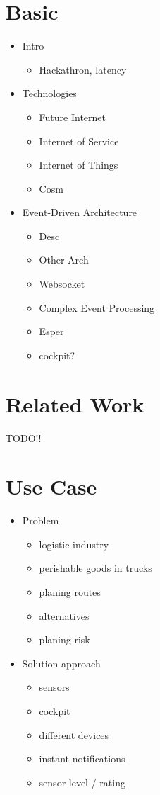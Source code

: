 \documentclass{acm_proc_article-sp}
\begin{document}
\section{Basic}
\label{sec:Basics}
\begin{itemize}
	\item Intro
	\begin{itemize}	
	\item Hackathron, latency
	\end{itemize}
	\item Technologies
	\begin{itemize}
	\item Future Internet
	\item Internet of Service
	\item Internet of Things
	\item Cosm
	\end{itemize}
	
	\item Event-Driven Architecture	
	\begin{itemize}
	\item Desc
	\item Other Arch
	\item Websocket	
	\item Complex Event Processing	
	\item Esper
	\item cockpit?
	\end{itemize}

\end{itemize}


\section{Related Work}
\label{sec:Related Work}

TODO!!

\section{Use Case}
\label{sec:Use Case}

\begin{itemize}
	\item Problem
	\begin{itemize}
		\item logistic industry
		\item perishable goods in trucks
		\item planing routes
		\item alternatives
		\item planing risk
	\end{itemize}
	
	\item Solution approach
	\begin{itemize}
		\item sensors
		\item cockpit
		\item different devices
		\item instant notifications
		\item sensor level / rating
	\end{itemize}
	
\end{itemize}
\end{document}
